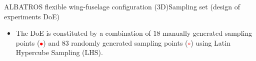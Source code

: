 \documentclass[10pt]{beamer}
\begin{document}
\begin{frame}{ALBATROS flexible wing-fuselage configuration (3D)}{Sampling set (design of experiments DoE)}

\begin{itemize}
\item The DoE is constituted by a combination of $18$ manually generated sampling points (\textcolor{red}{$\bullet$}) and $83$ randomly generated sampling points (\textcolor{red}{$\circ$}) using Latin Hypercube Sampling (LHS).

\end{itemize}
\begin{columns}
\begin{figure}
\end{figure}
\begin{figure}
\end{figure}
\end{columns}

\end{frame}
\end{document}
